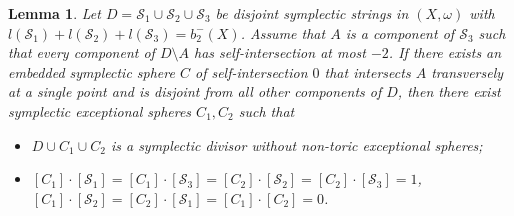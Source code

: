 \documentclass[11pt]{article}
\newtheorem{lemma}[theorem]{Lemma}
\theoremstyle{definition}
\theoremstyle{remark}
\newcommand{\st}{\mathcal{S}}
\begin{document}
\begin{lemma}\label{lemma:connecting}
   Let $D=\st_1\cup\st_2\cup\st_3$ be disjoint symplectic strings in $(X,\omega)$ with $l(\st_1)+l(\st_2)+l(\st_3)=b_2^-(X)$. Assume that $A$ is a component of $\st_3$ such that every component of $D\setminus A$ has self-intersection at most $-2$. If there exists an embedded symplectic sphere $C$ of self-intersection $0$ that intersects $A$ transversely at a single point and is disjoint from all other components of $D$, then there exist symplectic exceptional spheres $C_1,C_2$ such that
   \begin{itemize}[nosep]
    \item $D\cup C_1\cup C_2$ is a symplectic divisor without non-toric exceptional spheres;
    \item $[C_1]\cdot [\st_1]=[C_1]\cdot [\st_3]=[C_2]\cdot [\st_2]=[C_2]\cdot [\st_3]=1$, $[C_1]\cdot[\st_2]=[C_2]\cdot[\st_1]=[C_1]\cdot [C_2]=0$.
   \end{itemize}
\end{lemma}
\end{document}
